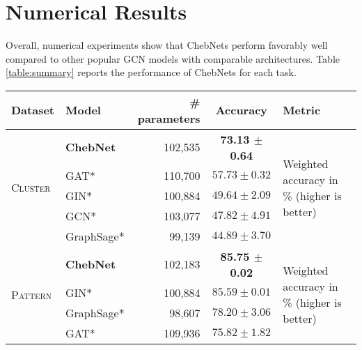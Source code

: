 \documentclass[letterpaper]{article} \usepackage{aaai21}  \usepackage{times}  \usepackage{helvet} \usepackage{courier}  \usepackage[hyphens]{url}  \usepackage{graphicx} \usepackage{natbib}  \usepackage{caption} \frenchspacing  \setlength{\pdfpagewidth}{8.5in}  \setlength{\pdfpageheight}{11in}
\begin{document}
\section{Numerical Results}

Overall, numerical experiments show that ChebNets perform favorably well compared to other popular GCN models with comparable architectures. Table \ref{table:summary} reports the performance of ChebNets for each task.



\begin{table*}[ht!]
\centering
\centering
\begin{tabular}{@{}llrcl@{}}
\toprule
Dataset                      & Model     & \# parameters & Accuracy                                      & Metric                                                \\ \midrule
\multirow{5}{*}{\textsc{ Cluster} }    & \textbf{ChebNet}   &  102,535       & \textbf{73.13 $\pm$ 0.64  }    & \multirow{5}{*}{Weighted accuracy in \% (higher is better)} \\
                             & GAT*       & 110,700        & $ 57.73 \pm 0.32  $                            &                                                       \\
                             & GIN*       & 100,884       & $ 49.64 \pm 2.09  $                             &                                                       \\
                             & GCN*       & 103,077       & $47.82 \pm 4.91 $                              &                                                       \\
                             & GraphSage* & 99,139        & $ 44.89 \pm 3.70  $                             &                                                       \\ \midrule
\multirow{5}{*}{\textsc{ Pattern} } & \textbf{ChebNet}   & 102,183        & \textbf{85.75 $\pm$ 0.02 }    &  \multirow{5}{*}{Weighted accuracy in \% (higher is better)}  \\
                              & GIN*       & 100,884       & $85.59 \pm 0.01 $           &   \\
                             & GraphSage* & 98,607        & $78.20 \pm 3.06 $                              &                                                       \\
                             & GAT*       & 109,936        & $ 75.82 \pm 1.82  $                            &                                                       \\

\end{tabular}
\end{table*}
\end{document}
